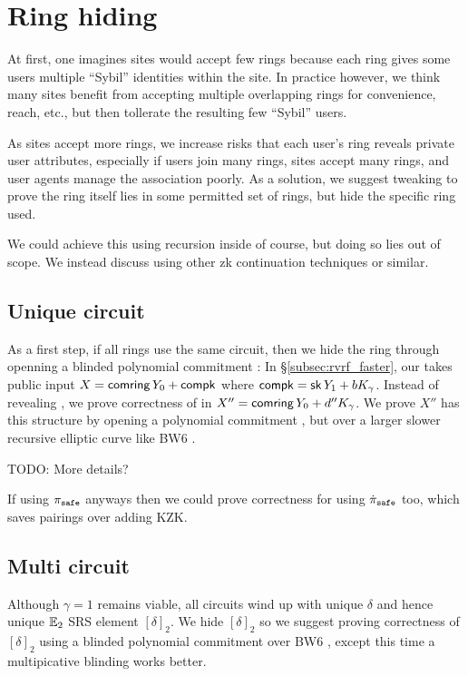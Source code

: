 \section{Ring hiding}%
\label{sec:ring_hiding}

At first, one imagines sites would accept few rings because each ring
gives some users multiple ``Sybil'' identities within the site.
In practice however, we think many sites benefit from accepting
multiple overlapping rings for convenience, reach, etc., but then
tollerate the resulting few ``Sybil'' users.

As sites accept more rings, we increase risks that each user's ring
\ctx reveals private user attributes, especially if
 users join many rings, sites accept many rings, and
 user agents manage the association poorly.
As a solution, we suggest tweaking \pifast to prove the ring itself
lies in some permitted set of rings, but hide the specific ring used.

We could achieve this using recursion inside \pifast of course,
but doing so lies out of scope.  We instead discuss using other
zk continuation techniques or similar.

\subsection{Unique circuit}

As a first step, if all rings use the same circuit, then we hide the
ring through openning a blinded polynomial commitment \cite{KZG}: 
In \S\ref{subsec:rvrf_faster}, our \pifast takes public input
 $X = \mathsf{comring}\, Y_0 + \mathsf{compk}$ where $\mathsf{compk} = \mathsf{sk}\, Y_1 + b K_\gamma$.
Instead of revealing \comring, we prove correctness of \comring in
 $X'' = \mathsf{comring}\, Y_0 + d'' K_\gamma$.
We prove $X''$ has this structure by opening a polynomial commitment
\cite{KZG}, but over a larger slower recursive elliptic curve
 like BW6 \cite{BW6}.

TODO: More details?

If using $\pi_{\mathtt{safe}}$ anyways then we could prove correctness for \comring
using $\dot{\pi}_{\mathtt{safe}}$ too, which saves pairings over adding KZK.

\subsection{Multi circuit}

Although $\gamma=1$ remains viable, all circuits wind up with
unique $\delta$ and hence unique ${\mathbb{E}}_2$ SRS element $[\delta]_2$.
We hide $[\delta]_2$ so we suggest proving correctness of $[\delta]_2$
using a blinded polynomial commitment \cite{KZG} over BW6 \cite{BW6},
except this time a multipicative blinding works better.

